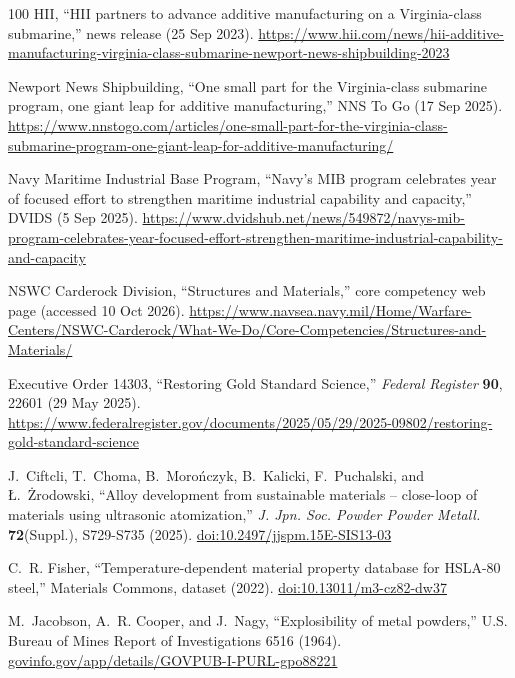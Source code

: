 \documentclass[12pt,letterpaper]{article}
\begin{document}
\begin{thebibliography}{100}
HII, ``HII partners to advance additive manufacturing on a Virginia-class submarine,'' news release (25 Sep 2023).
\url{https://www.hii.com/news/hii-additive-manufacturing-virginia-class-submarine-newport-news-shipbuilding-2023}

Newport News Shipbuilding, ``One small part for the Virginia-class submarine program, one giant leap for additive manufacturing,'' NNS To Go (17 Sep 2025).
\url{https://www.nnstogo.com/articles/one-small-part-for-the-virginia-class-submarine-program-one-giant-leap-for-additive-manufacturing/}

Navy Maritime Industrial Base Program, ``Navy's MIB program celebrates year of focused effort to strengthen maritime industrial capability and capacity,'' DVIDS (5 Sep 2025).
\url{https://www.dvidshub.net/news/549872/navys-mib-program-celebrates-year-focused-effort-strengthen-maritime-industrial-capability-and-capacity}

NSWC Carderock Division, ``Structures and Materials,'' core competency web page (accessed 10 Oct 2026).
\url{https://www.navsea.navy.mil/Home/Warfare-Centers/NSWC-Carderock/What-We-Do/Core-Competencies/Structures-and-Materials/}

Executive Order 14303, ``Restoring Gold Standard Science,'' \emph{Federal
Register} \textbf{90}, 22601 (29 May 2025).
\url{https://www.federalregister.gov/documents/2025/05/29/2025-09802/restoring-gold-standard-science}

J.~Ciftcli, T.~Choma, B.~Morończyk, B.~Kalicki, F.~Puchalski, and {\L}.~\.{Z}rodowski, ``Alloy development from sustainable materials -- close-loop of materials using ultrasonic atomization,'' \emph{J. Jpn. Soc. Powder Powder Metall.} \textbf{72}(Suppl.), S729-S735 (2025).
\href{https://doi.org/10.2497/jjspm.15E-SIS13-03}{doi:10.2497/jjspm.15E-SIS13-03}

C.~R. Fisher, ``Temperature-dependent material property database for HSLA-80 steel,'' Materials Commons, dataset (2022).
\href{https://doi.org/10.13011/m3-cz82-dw37}{doi:10.13011/m3-cz82-dw37}

M.~Jacobson, A.~R. Cooper, and J.~Nagy, ``Explosibility of metal powders,''
U.S. Bureau of Mines Report of Investigations 6516 (1964).
\href{https://www.govinfo.gov/app/details/GOVPUB-I-PURL-gpo88221}{govinfo.gov/app/details/GOVPUB-I-PURL-gpo88221}

\end{thebibliography}
\end{document}

